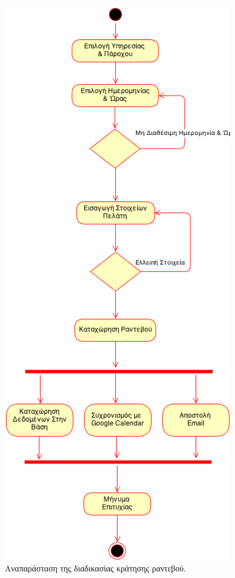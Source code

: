 \begin{figure}[H]
\centering
\includegraphics[width=100mm]{images/ad-book-appointment.png}
\caption{Αναπαράσταση της διαδικασίας κράτησης ραντεβού.}
\label{ad-book-appointment}
\end{figure}

